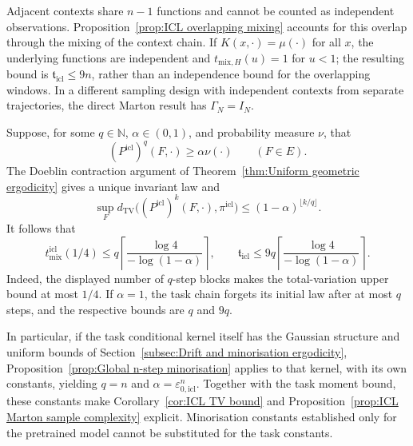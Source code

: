 Adjacent contexts share \(n-1\) functions and cannot be counted as independent observations. Proposition~\ref{prop:ICL overlapping mixing} accounts for this overlap through the mixing of the context chain. If \(K(x,\cdot)=\mu(\cdot)\) for all \(x\), the underlying functions are independent and \(t_{\mathrm{mix},H}(u)=1\) for \(u<1\); the resulting bound is \(\mathfrak t_{\mathrm{icl}}\leqslant9n\), rather than an independence bound for the overlapping windows. In a different sampling design with independent contexts from separate trajectories, the direct Marton result has \(\Gamma_N=I_N\).

\begin{example}
\label{ex:ICL Doeblin task}
Suppose, for some \(q\in\mathbb N\), \(\alpha\in(0,1)\), and probability measure \(\nu\), that
\[
(P^{\mathrm{icl}})^q(F,\cdot)\geqslant\alpha\nu(\cdot)
\qquad(F\in E).
\]
The Doeblin contraction argument of Theorem~\ref{thm:Uniform geometric ergodicity} gives a unique invariant law and
\[
\sup_Fd_{\mathrm{TV}}\bigl((P^{\mathrm{icl}})^k(F,\cdot),\pi^{\mathrm{icl}}\bigr)
\leqslant(1-\alpha)^{\lfloor k/q\rfloor}.
\]
It follows that
\[
t_{\mathrm{mix}}^{\mathrm{icl}}(1/4)
\leqslant q\left\lceil\frac{\log4}{-\log(1-\alpha)}\right\rceil,
\qquad
\mathfrak t_{\mathrm{icl}}
\leqslant9q\left\lceil\frac{\log4}{-\log(1-\alpha)}\right\rceil.
\]
Indeed, the displayed number of \(q\)-step blocks makes the total-variation upper bound at most \(1/4\). If \(\alpha=1\), the task chain forgets its initial law after at most \(q\) steps, and the respective bounds are \(q\) and \(9q\).

In particular, if the task conditional kernel itself has the Gaussian structure and uniform bounds of Section~\ref{subsec:Drift and minorisation ergodicity}, Proposition~\ref{prop:Global n-step minorisation} applies to that kernel, with its own constants, yielding \(q=n\) and \(\alpha=\varepsilon_{0,\mathrm{icl}}^n\). Together with the task moment bound, these constants make Corollary~\ref{cor:ICL TV bound} and Proposition~\ref{prop:ICL Marton sample complexity} explicit. Minorisation constants established only for the pretrained model cannot be substituted for the task constants.
\end{example}

